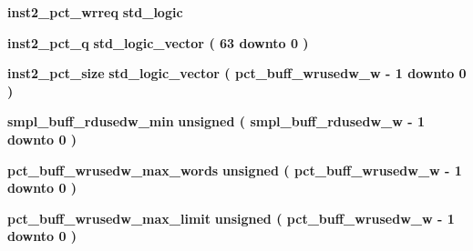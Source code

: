 \begin{DoxyCompactItemize}
\item 
{\bf inst2\+\_\+pct\+\_\+wrreq} {\bfseries \textcolor{comment}{std\+\_\+logic}\textcolor{vhdlchar}{ }} 
\item 
{\bf inst2\+\_\+pct\+\_\+q} {\bfseries \textcolor{comment}{std\+\_\+logic\+\_\+vector}\textcolor{vhdlchar}{ }\textcolor{vhdlchar}{(}\textcolor{vhdlchar}{ }\textcolor{vhdlchar}{ } \textcolor{vhdldigit}{63} \textcolor{vhdlchar}{ }\textcolor{keywordflow}{downto}\textcolor{vhdlchar}{ }\textcolor{vhdlchar}{ } \textcolor{vhdldigit}{0} \textcolor{vhdlchar}{ }\textcolor{vhdlchar}{)}\textcolor{vhdlchar}{ }} 
\item 
{\bf inst2\+\_\+pct\+\_\+size} {\bfseries \textcolor{comment}{std\+\_\+logic\+\_\+vector}\textcolor{vhdlchar}{ }\textcolor{vhdlchar}{(}\textcolor{vhdlchar}{ }\textcolor{vhdlchar}{ }\textcolor{vhdlchar}{ }\textcolor{vhdlchar}{ }{\bfseries {\bf pct\+\_\+buff\+\_\+wrusedw\+\_\+w}} \textcolor{vhdlchar}{-\/}\textcolor{vhdlchar}{ } \textcolor{vhdldigit}{1} \textcolor{vhdlchar}{ }\textcolor{keywordflow}{downto}\textcolor{vhdlchar}{ }\textcolor{vhdlchar}{ } \textcolor{vhdldigit}{0} \textcolor{vhdlchar}{ }\textcolor{vhdlchar}{)}\textcolor{vhdlchar}{ }} 
\item 
{\bf smpl\+\_\+buff\+\_\+rdusedw\+\_\+min} {\bfseries \textcolor{comment}{unsigned}\textcolor{vhdlchar}{ }\textcolor{vhdlchar}{(}\textcolor{vhdlchar}{ }\textcolor{vhdlchar}{ }\textcolor{vhdlchar}{ }\textcolor{vhdlchar}{ }{\bfseries {\bf smpl\+\_\+buff\+\_\+rdusedw\+\_\+w}} \textcolor{vhdlchar}{-\/}\textcolor{vhdlchar}{ } \textcolor{vhdldigit}{1} \textcolor{vhdlchar}{ }\textcolor{keywordflow}{downto}\textcolor{vhdlchar}{ }\textcolor{vhdlchar}{ } \textcolor{vhdldigit}{0} \textcolor{vhdlchar}{ }\textcolor{vhdlchar}{)}\textcolor{vhdlchar}{ }} 
\item 
{\bf pct\+\_\+buff\+\_\+wrusedw\+\_\+max\+\_\+words} {\bfseries \textcolor{comment}{unsigned}\textcolor{vhdlchar}{ }\textcolor{vhdlchar}{(}\textcolor{vhdlchar}{ }\textcolor{vhdlchar}{ }\textcolor{vhdlchar}{ }\textcolor{vhdlchar}{ }{\bfseries {\bf pct\+\_\+buff\+\_\+wrusedw\+\_\+w}} \textcolor{vhdlchar}{-\/}\textcolor{vhdlchar}{ } \textcolor{vhdldigit}{1} \textcolor{vhdlchar}{ }\textcolor{keywordflow}{downto}\textcolor{vhdlchar}{ }\textcolor{vhdlchar}{ } \textcolor{vhdldigit}{0} \textcolor{vhdlchar}{ }\textcolor{vhdlchar}{)}\textcolor{vhdlchar}{ }} 
\item 
{\bf pct\+\_\+buff\+\_\+wrusedw\+\_\+max\+\_\+limit} {\bfseries \textcolor{comment}{unsigned}\textcolor{vhdlchar}{ }\textcolor{vhdlchar}{(}\textcolor{vhdlchar}{ }\textcolor{vhdlchar}{ }\textcolor{vhdlchar}{ }\textcolor{vhdlchar}{ }{\bfseries {\bf pct\+\_\+buff\+\_\+wrusedw\+\_\+w}} \textcolor{vhdlchar}{-\/}\textcolor{vhdlchar}{ } \textcolor{vhdldigit}{1} \textcolor{vhdlchar}{ }\textcolor{keywordflow}{downto}\textcolor{vhdlchar}{ }\textcolor{vhdlchar}{ } \textcolor{vhdldigit}{0} \textcolor{vhdlchar}{ }\textcolor{vhdlchar}{)}\textcolor{vhdlchar}{ }} 

\end{DoxyCompactItemize}
